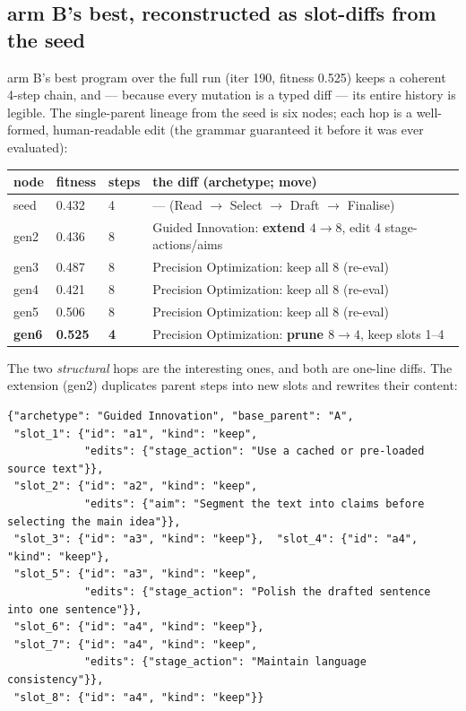 \documentclass[11pt]{article}
\newcommand{\armB}{\textcolor{accent}{arm B}}
\begin{document}
\subsection{\armB's best, reconstructed as slot-diffs from the seed}
\armB's best program over the full run (iter 190, fitness 0.525) keeps a coherent 4-step
chain, and --- because every mutation is a typed diff --- its entire history is legible. The
single-parent lineage from the seed is six nodes; each hop is a well-formed, human-readable
edit (the grammar guaranteed it before it was ever evaluated):
\begin{center}\small
\begin{tabular}{llll}
\toprule
node & fitness & steps & the diff (archetype; move) \\
\midrule
seed & 0.432 & 4 & --- (Read $\to$ Select $\to$ Draft $\to$ Finalise) \\
gen2 & 0.436 & 8 & Guided Innovation: \textbf{extend $4\!\to\!8$}, edit 4 stage-actions/aims \\
gen3 & 0.487 & 8 & Precision Optimization: keep all 8 (re-eval) \\
gen4 & 0.421 & 8 & Precision Optimization: keep all 8 (re-eval) \\
gen5 & 0.506 & 8 & Precision Optimization: keep all 8 (re-eval) \\
\textbf{gen6} & \textbf{0.525} & \textbf{4} & Precision Optimization: \textbf{prune $8\!\to\!4$}, keep slots 1--4 \\
\bottomrule
\end{tabular}
\end{center}
The two \emph{structural} hops are the interesting ones, and both are one-line diffs. The
extension (gen2) duplicates parent steps into new slots and rewrites their content:
\begin{lstlisting}
{"archetype": "Guided Innovation", "base_parent": "A",
 "slot_1": {"id": "a1", "kind": "keep",
            "edits": {"stage_action": "Use a cached or pre-loaded source text"}},
 "slot_2": {"id": "a2", "kind": "keep",
            "edits": {"aim": "Segment the text into claims before selecting the main idea"}},
 "slot_3": {"id": "a3", "kind": "keep"},  "slot_4": {"id": "a4", "kind": "keep"},
 "slot_5": {"id": "a3", "kind": "keep",
            "edits": {"stage_action": "Polish the drafted sentence into one sentence"}},
 "slot_6": {"id": "a4", "kind": "keep"},
 "slot_7": {"id": "a4", "kind": "keep",
            "edits": {"stage_action": "Maintain language consistency"}},
 "slot_8": {"id": "a4", "kind": "keep"}}
\end{lstlisting}
\end{document}
